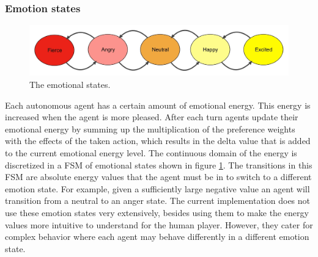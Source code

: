 \documentclass[11pt,a4paper]{article}
\begin{document}
    \subsubsection{Emotion states}
    \begin{figure}
\centering
\includegraphics[scale=0.25]{States-image}
\caption{The emotional states.}
\label{fig:es}
\end{figure}
      Each autonomous agent has a certain amount of emotional energy. This energy is increased when the agent is more pleased. After each turn agents update their emotional energy by summing up the multiplication of the preference weights with the effects of the taken action, which results in the delta value that is added to the current emotional energy level. The continuous domain of the energy is discretized in a FSM of emotional states shown in figure \ref{fig:es}. The transitions in this FSM are absolute energy values that the agent must be in to switch to a different emotion state. For example, given a sufficiently large negative value an agent will transition from a neutral to an anger state. The current implementation does not use these emotion states very extensively, besides using them to make the energy values more intuitive to understand for the human player. However, they cater for complex behavior where each agent may behave differently in a different emotion state.
\end{document}
